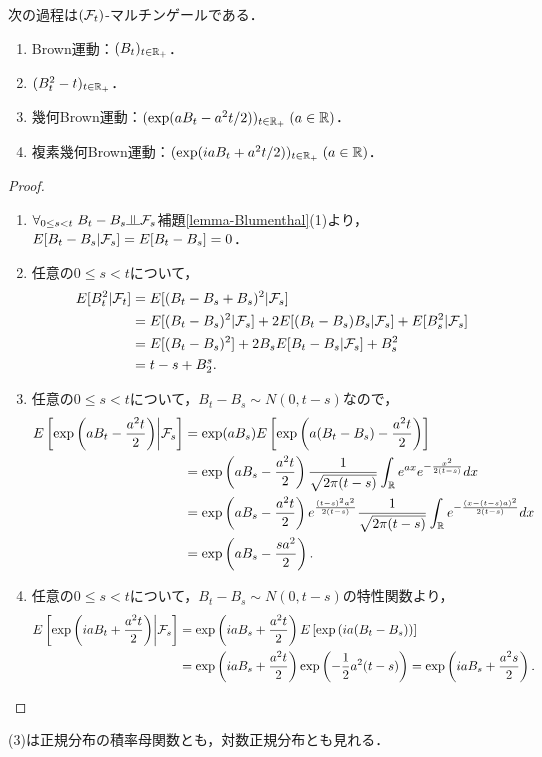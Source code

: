 \documentclass[uplatex,dvipdfmx]{jsreport}
\begin{document}
\begin{theorem}
    次の過程は$(\mathcal{F}_t)$-マルチンゲールである．
    \begin{enumerate}
        \item Brown運動：$(B_t)_{t\in\mathbb{R}_+}$．
        \item $(B^2_t-t)_{t\in\mathbb{R}_+}$．
        \item 幾何Brown運動：$(\exp(aB_t-a^2t/2))_{t\in\mathbb{R}_+}\;(a\in\mathbb{R})$．
        \item 複素幾何Brown運動：$(\exp(iaB_t+a^2t/2))_{t\in\mathbb{R}_+}\;(a\in\mathbb{R})$．
    \end{enumerate}
\end{theorem}
\begin{proof}\mbox{}
    \begin{enumerate}
        \item $\forall_{0\le s<t}\;B_t-B_s\indep\F_s$補題\ref{lemma-Blumenthal}(1)より，$E[B_t-B_s|\mathcal{F}_s]=E[B_t-B_s]=0$．
        \item 任意の$0\le s<t$について，
        \begin{align*}
            E[B^2_t|\mathcal{F}_t]&=E[(B_t-B_s+B_s)^2|\mathcal{F}_s]\\
            &=E[(B_t-B_s)^2|\mathcal{F}_s]+2E[(B_t-B_s)B_s|\mathcal{F}_s]+E[B^2_s|\mathcal{F}_s]\\
            &=E[(B_t-B_s)^2]+2B_sE[B_t-B_s|\mathcal{F}_s]+B^2_s\\
            &=t-s+B_2^s.
        \end{align*}
        \item 任意の$0\le s<t$について，$B_t-B_s\sim N(0,t-s)$なので，
        \begin{align*}
            E\left[\exp\left(aB_t-\frac{a^2t}{2}\right)\middle|\mathcal{F}_s\right]&=\exp(aB_s)E\left[\exp\left(a(B_t-B_s)-\frac{a^2t}{2}\right)\right]\\
            &=\exp\left(aB_s-\frac{a^2t}{2}\right)\frac{1}{\sqrt{2\pi(t-s)}}\int_{\mathbb{R}} e^{ax}e^{-\frac{x^2}{2(t-s)}}dx\\
            &=\exp\left(aB_s-\frac{a^2t}{2}\right)e^{\frac{(t-s)^2a^2}{2(t-s)}}\frac{1}{\sqrt{2\pi(t-s)}}\int_{\mathbb{R}} e^{-\frac{(x-(t-s)a)^2}{2(t-s)}}dx\\
            &=\exp\left(aB_s-\frac{sa^2}{2}\right).
        \end{align*}
        \item 任意の$0\le s<t$について，$B_t-B_s\sim N(0,t-s)$の特性関数より，
        \begin{align*}
            E\left[\exp\left(iaB_t+\frac{a^2t}{2}\right)\middle|\mathcal{F}_s\right]&=\exp\left(iaB_s+\frac{a^2t}{2}\right)E\left[\exp\left(ia(B_t-B_s)\right)\right]\\
            &=\exp\left(iaB_s+\frac{a^2t}{2}\right)\exp\left(-\frac{1}{2}a^2(t-s)\right)=\exp\left(iaB_s+\frac{a^2s}{2}\right).
        \end{align*}
    \end{enumerate}
\end{proof}
\begin{remarks}
    (3)は正規分布の積率母関数とも，対数正規分布とも見れる．
\end{remarks}
\end{document}

